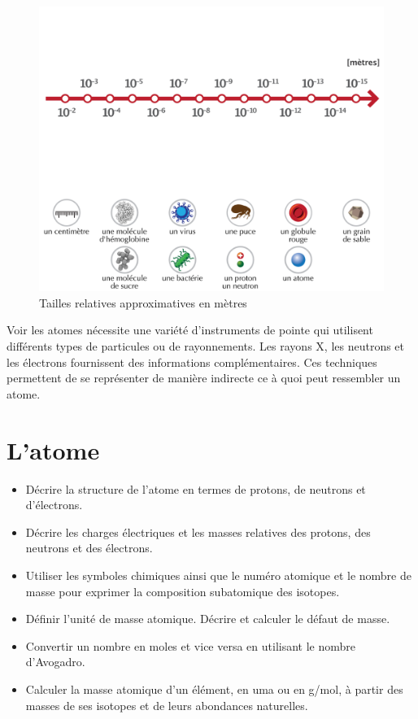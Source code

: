 \documentclass[
  11pt,
  a4paper,
  openany]{book}
\providecommand{\tightlist}{%
  \setlength{\itemsep}{0pt}\setlength{\parskip}{0pt}}
\begin{document}
\begin{figure}

{\centering \includegraphics[width=1\linewidth]{images/ordre-grandeur-ex} 

}

\caption{Tailles relatives approximatives en mètres}\label{fig:ordre-grandeur-ex}
\end{figure}

Voir les atomes nécessite une variété d'instruments de pointe qui utilisent différents types de particules ou de rayonnements. Les rayons X, les neutrons et les électrons fournissent des informations complémentaires. Ces techniques permettent de se représenter de manière indirecte ce à quoi peut ressembler un atome.

\hypertarget{latome}{%
\chapter{L'atome}\label{latome}}

\begin{objectives}

\begin{itemize}
\tightlist
\item
  Décrire la structure de l'atome en termes de protons, de neutrons et d'électrons.
\item
  Décrire les charges électriques et les masses relatives des protons, des neutrons et des électrons.
\item
  Utiliser les symboles chimiques ainsi que le numéro atomique et le nombre de masse pour exprimer la composition subatomique des isotopes.
\item
  Définir l'unité de masse atomique. Décrire et calculer le défaut de masse.
\item
  Convertir un nombre en moles et vice versa en utilisant le nombre d'Avogadro.
\item
  Calculer la masse atomique d'un élément, en uma ou en g/mol, à partir des masses de ses isotopes et de leurs abondances naturelles.
\end{itemize}

\end{objectives}
\end{document}
